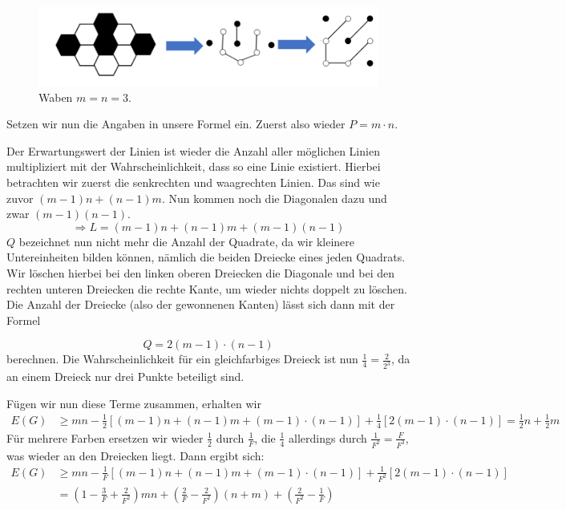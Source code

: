 \documentclass[11pt,a4paper]{article}
\numberwithin{equation}{section}
\numberwithin{table}{section}
\numberwithin{figure}{section}
\begin{document}
\begin{center}
\vspace{-1.5em}
\begin{figure}[H]\label{bild8}
\begin{center}\includegraphics[scale=0.6]{8.png}
\caption{Waben $m=n=3$.}\end{center}
\end{figure}
\end{center}
Setzen wir nun die Angaben in unsere Formel ein. Zuerst also wieder $P=m\cdot n.$
\par\medskip\noindent
Der Erwartungswert der Linien ist wieder die Anzahl aller möglichen Linien multipliziert mit der Wahrscheinlichkeit, dass so eine Linie existiert. Hierbei betrachten wir zuerst die senkrechten und waagrechten Linien. Das sind wie zuvor
$(m-1)n+(n-1)m.$
Nun kommen noch die Diagonalen dazu und zwar $(m-1)(n-1).$
$$\Rightarrow L=(m-1)n+(n-1)m+(m-1)(n-1)$$
$Q$ bezeichnet nun nicht mehr die Anzahl der Quadrate, da wir kleinere Untereinheiten bilden können, nämlich die beiden Dreiecke eines jeden Quadrats. Wir löschen hierbei bei den linken oberen Dreiecken die Diagonale und bei den rechten unteren Dreiecken die rechte Kante, um wieder nichts doppelt zu löschen. Die Anzahl der Dreiecke (also der gewonnenen Kanten) lässt sich dann mit der Formel

$$Q=2(m-1)\cdot(n-1)$$
berechnen. Die Wahrscheinlichkeit für ein gleichfarbiges Dreieck ist nun $\frac{1}{4}=\frac{2}{2^3}$, da an einem Dreieck nur drei Punkte beteiligt sind.\par\noindent

\noindent Fügen wir nun diese Terme zusammen, erhalten wir \small
\begin{align*}
E(G)&\geq mn-\frac{1}{2} [(m-1)n+(n-1)m+(m-1)\cdot(n-1)]+\frac{1}{4} [2(m-1)\cdot(n-1)]=\frac{1}{2} n+\frac{1}{2} m
\end{align*}
\normalsize
\noindent Für mehrere Farben ersetzen wir wieder $\frac{1}{2}$ durch $\frac{1}{F}$, die $\frac{1}{4}$ allerdings durch $\frac{1}{F^2}=\frac{F}{F^3}$, was wieder an den Dreiecken liegt.
Dann ergibt sich:
\begin{align*}
E(G)&\geq mn-\frac{1}{F} [(m-1)n+(n-1)m+(m-1)\cdot(n-1)]+\frac{1}{F^2} [2(m-1)\cdot(n-1)]\\
&=
\left(1-\frac{3}{F}+\frac{2}{F^2}\right)mn+\left(\frac{2}{F}-\frac{2}{F^2}\right)(n+m)+ \left(\frac{2}{F^2} -\frac{1}{F}\right)
\end{align*} 
\end{document}
